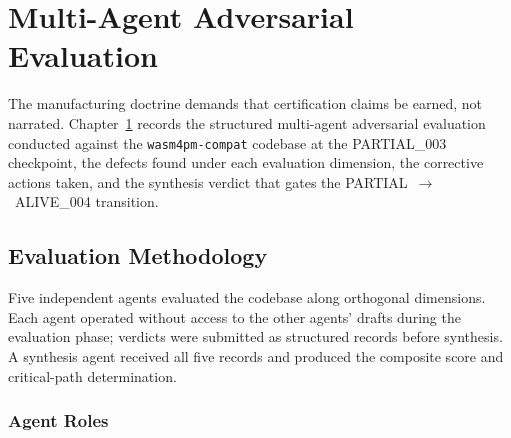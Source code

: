 \chapter{Multi-Agent Adversarial Evaluation}
\label{ch:evaluation}

The manufacturing doctrine demands that certification claims be earned, not narrated. Chapter~\ref{ch:evaluation}
records the structured multi-agent adversarial evaluation conducted against the
\texttt{wasm4pm-compat} codebase at the PARTIAL\_003 checkpoint, the defects
found under each evaluation dimension, the corrective actions taken, and the
synthesis verdict that gates the PARTIAL~$\to$~ALIVE\_004 transition.

\section{Evaluation Methodology}
\label{sec:eval-methodology}

Five independent agents evaluated the codebase along orthogonal dimensions.
Each agent operated without access to the other agents' drafts during the
evaluation phase; verdicts were submitted as structured records before
synthesis. A synthesis agent received all five records and produced the
composite score and critical-path determination.

\subsection{Agent Roles}

